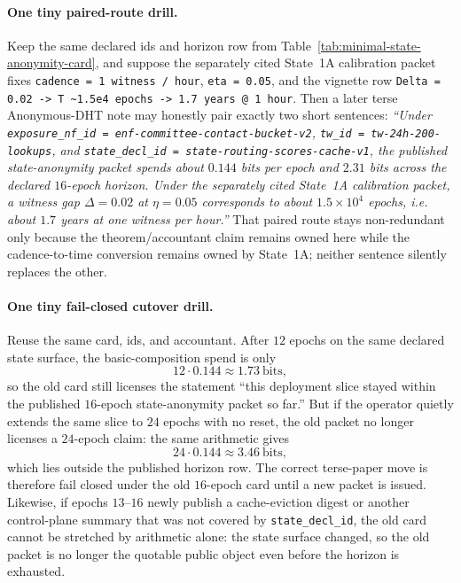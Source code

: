 \documentclass[11pt]{article}
\begin{document}
\paragraph{One tiny paired-route drill.}
Keep the same declared ids and horizon row from Table~\ref{tab:minimal-state-anonymity-card}, and suppose the separately cited State~1A calibration packet fixes \texttt{cadence = 1 witness / hour}, \texttt{eta = 0.05}, and the vignette row \texttt{Delta = 0.02 -> T \textasciitilde 1.5e4 epochs -> 1.7 years @ 1 hour}.
Then a later terse Anonymous-DHT note may honestly pair exactly two short sentences: \emph{``Under \nolinkurl{exposure_nf_id = enf-committee-contact-bucket-v2}, \nolinkurl{tw_id = tw-24h-200-lookups}, and \nolinkurl{state_decl_id = state-routing-scores-cache-v1}, the published state-anonymity packet spends about $0.144$ bits per epoch and $2.31$ bits across the declared $16$-epoch horizon. Under the separately cited State~1A calibration packet, a witness gap $\Delta=0.02$ at $\eta=0.05$ corresponds to about $1.5\times 10^{4}$ epochs, i.e. about $1.7$ years at one witness per hour.''}
That paired route stays non-redundant only because the theorem/accountant claim remains owned here while the cadence-to-time conversion remains owned by State~1A; neither sentence silently replaces the other.\cite{series:state1addendum}

\paragraph{One tiny fail-closed cutover drill.}
Reuse the same card, ids, and accountant. After $12$ epochs on the same declared state surface, the basic-composition spend is only
\[
12\cdot 0.144 \approx 1.73\ \text{bits},
\]
so the old card still licenses the statement ``this deployment slice stayed within the published $16$-epoch state-anonymity packet so far.''
But if the operator quietly extends the same slice to $24$ epochs with no reset, the old packet no longer licenses a $24$-epoch claim: the same arithmetic gives
\[
24\cdot 0.144 \approx 3.46\ \text{bits},
\]
which lies outside the published horizon row. The correct terse-paper move is therefore fail closed under the old $16$-epoch card until a new packet is issued.
Likewise, if epochs $13$--$16$ newly publish a cache-eviction digest or another control-plane summary that was not covered by \texttt{state\_decl\_id}, the old card cannot be stretched by arithmetic alone: the state surface changed, so the old packet is no longer the quotable public object even before the horizon is exhausted.
\end{document}
